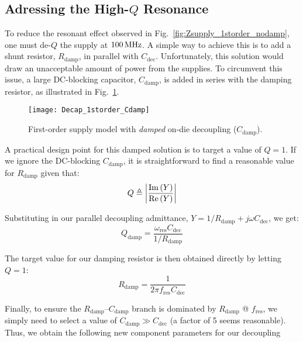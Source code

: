 \subsection{Adressing the High-$Q$ Resonance}
\par To reduce the resonant effect observed in Fig.~\ref{fig:Zsupply_1storder_nodamp},
one must de-$Q$ the supply at $100\mathrm{\,MHz}$.  A simple way to achieve this is
to add a shunt resistor, $R_\mathrm{damp}$, in parallel with $C_\mathrm{dec}$.
Unfortunately, this solution would draw an unacceptable amount of power from
the supplies. To circumvent this issue, a large DC-blocking capacitor,
$C_\mathrm{damp}$, is added in series with the damping resistor, as
illustrated in Fig.~\ref{fig:Decap_1storder_damp}.
%
\begin{figure}[!ht]
	\centering
	\texttt{[image: Decap\_1storder\_Cdamp]}
	\caption{First-order supply model with \emph{damped} on-die decoupling ($C_\mathrm{damp}$).}
\label{fig:Decap_1storder_damp}%
\end{figure}
%
\par A practical design point for this damped solution is to target a value of
$Q=1$. If we ignore the DC-blocking $C_\mathrm{damp}$, it is straightforward
to find a reasonable value for $R_\mathrm{damp}$ given that:
%
\begin{equation}
	Q \triangleq \left |\frac{\mathrm{Im}\left(Y\right)}{\mathrm{Re}\left(Y\right)}\right |
\end{equation}
%
\par\noindent Substituting in our parallel decoupling admittance, 
$Y=1/R_\mathrm{damp} + j\omega C_\mathrm{dec}$, we get:
\begin{equation}
	Q_\mathrm{damp} = \frac{\omega_\mathrm{res} C_\mathrm{dec}}{1/R_\mathrm{damp}}
\end{equation}
%
\par\noindent The target value for our damping resistor is then
obtained directly by letting $Q=1$:
\begin{equation}
	R_\mathrm{damp} = \frac{1}{2\pi f_\mathrm{res}C_\mathrm{dec}}
\end{equation}
%
\par Finally, to ensure the $R_\mathrm{damp}$--$C_\mathrm{damp}$ branch is
dominated by $R_\mathrm{damp}$ @ $f_\mathrm{res}$, we simply need to select a
value of $C_\mathrm{damp} \gg C_\mathrm{dec}$ (a factor of 5 seems reasonable).
Thus, we obtain the following new component parameters for our decoupling
